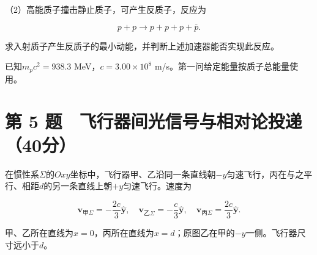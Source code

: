 \documentclass[12pt,a4paper,fontset=fandol]{ctexart}
\begin{document}
（2）高能质子撞击静止质子，可产生反质子，反应为

\[
p+p\longrightarrow p+p+p+\overline p.
\]

求入射质子产生反质子的最小动能，并判断上述加速器能否实现此反应。

已知\(m_pc^2=938.3\) MeV，\(c=3.00\times10^8\)
m/s。第一问给定能量按质子总能量使用。

\clearpage

\section{第 5
题　飞行器间光信号与相对论投递（40分）}\label{ux7b2c-5-ux9898-ux98deux884cux5668ux95f4ux5149ux4fe1ux53f7ux4e0eux76f8ux5bf9ux8bbaux6295ux901240ux5206}

在惯性系\(\Sigma\)的\(Oxy\)坐标中，飞行器甲、乙沿同一条直线朝\(-y\)匀速飞行，丙在与之平行、相距\(d\)的另一条直线上朝\(+y\)匀速飞行。速度为

\[
\mathbf v_{\text{甲}\Sigma}=-\frac{2c}{3}\hat{\mathbf y},
\quad
\mathbf v_{\text{乙}\Sigma}=-\frac c3\hat{\mathbf y},
\quad
\mathbf v_{\text{丙}\Sigma}=\frac{2c}{3}\hat{\mathbf y}.
\]

甲、乙所在直线为\(x=0\)，丙所在直线为\(x=d\)；原图乙在甲的\(-y\)一侧。飞行器尺寸远小于\(d\)。

\begin{center}
\begin{minipage}{\linewidth}
\centering\begingroup{}
\ifdim\wd\diagrambox>.88\linewidth
\sbox{\diagrambox}{\resizebox{.88\linewidth}{!}{\usebox{\diagrambox}}}\fi
\ifdim\ht\diagrambox>.20\textheight
\resizebox{!}{.20\textheight}{\usebox{\diagrambox}}
\else\usebox{\diagrambox}\fi
\par{}\endgroup\end{minipage}\end{center}
\end{document}
